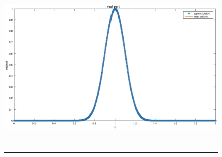 \begin{figure}[htbp]
	\centering
		\includegraphics[height=8cm]{Figures/real_OSTFPM_2_1.eps}\\
		\rule{35em}{0.5pt}
	\caption[OSTFPM real part]{}
\end{figure}





